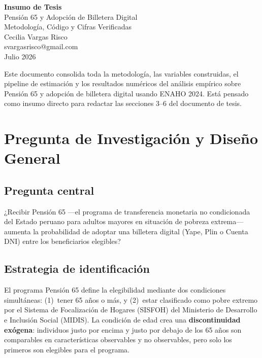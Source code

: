 \documentclass[12pt, a4paper]{article}
\begin{document}

\begin{titlepage}
\centering
\vspace*{2cm}
{\LARGE\bfseries Insumo de Tesis\\[0.4em]}
{\Large Pensión 65 y Adopción de Billetera Digital\\[0.3em]}
{\large Metodología, Código y Cifras Verificadas\\[2cm]}
{\normalsize Cecilia Vargas Risco\\[0.5em]}
{\small svargasrisco@gmail.com\\[0.5em]}
{\small Julio 2026\\[3cm]}
\begin{tcolorbox}[colback=gray!10, colframe=gray!40, width=0.85\textwidth]
\small\centering
Este documento consolida toda la metodología, las variables construidas,
el pipeline de estimación y los resultados numéricos del análisis empírico
sobre Pensión 65 y adopción de billetera digital usando ENAHO 2024.
Está pensado como insumo directo para redactar las secciones 3--6 del documento de tesis.
\end{tcolorbox}
\end{titlepage}

\tableofcontents
\newpage

\section{Pregunta de Investigación y Diseño General}

\subsection{Pregunta central}

¿Recibir Pensión 65 ---el programa de transferencia monetaria no condicionada
del Estado peruano para adultos mayores en situación de pobreza extrema---
aumenta la probabilidad de adoptar una billetera digital (Yape, Plin o Cuenta
DNI) entre los beneficiarios elegibles?

\subsection{Estrategia de identificación}

El programa Pensión 65 define la elegibilidad mediante dos condiciones
simultáneas: (1)~tener 65 años o más, y (2)~estar clasificado como pobre
extremo por el Sistema de Focalización de Hogares (SISFOH) del Ministerio
de Desarrollo e Inclusión Social (MIDIS). La condición de edad crea una
\textbf{discontinuidad exógena}: individuos justo por encima y justo por
debajo de los 65 años son comparables en características observables y no
observables, pero solo los primeros son elegibles para el programa.
\end{document}

